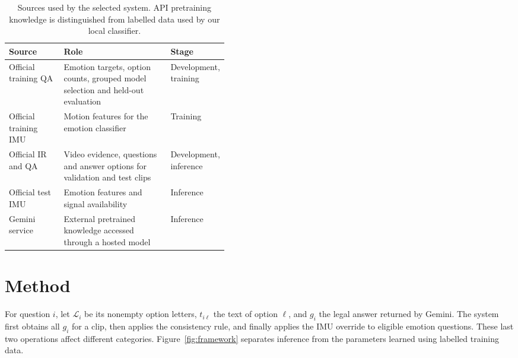 \documentclass[12pt,a4paper]{article}
\begin{document}
\begin{table}[htbp]
\centering
\caption{Sources used by the selected system. API pretraining knowledge is distinguished from labelled data used by our local classifier.}
\begin{tabularx}{\linewidth}{@{}P{0.25\linewidth}YP{0.18\linewidth}@{}}
\toprule Source & Role & Stage \\
\midrule
Official training QA & Emotion targets, option counts, grouped model selection and held-out evaluation & Development, training \\
Official training IMU & Motion features for the emotion classifier & Training \\
Official IR and QA & Video evidence, questions and answer options for validation and test clips & Development, inference \\
Official test IMU & Emotion features and signal availability & Inference \\
Gemini service & External pretrained knowledge accessed through a hosted model & Inference \\
\bottomrule
\end{tabularx}
\end{table}

\section{Method}
For question $i$, let $\mathcal{L}_i$ be its nonempty option letters, $t_{i\ell}$ the text of option $\ell$, and $g_i$ the legal answer returned by Gemini. The system first obtains all $g_i$ for a clip, then applies the consistency rule, and finally applies the IMU override to eligible emotion questions. These last two operations affect different categories. Figure~\ref{fig:framework} separates inference from the parameters learned using labelled training data.
\end{document}
